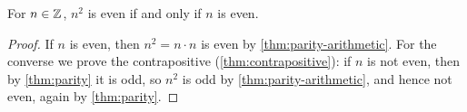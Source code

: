 \begin{theorem}\label{thm:square-parity}
  For $n \in \mathbb{Z}$, $n^2$ is even if and only if $n$ is even.
\end{theorem}

\begin{proof}
  If $n$ is even, then $n^2 = n \cdot n$ is even by
  \cref{thm:parity-arithmetic}. For the converse we prove the contrapositive
  (\cref{thm:contrapositive}): if $n$ is not even, then by \cref{thm:parity}
  it is odd, so $n^2$ is odd by \cref{thm:parity-arithmetic}, and hence not
  even, again by \cref{thm:parity}.
\end{proof}
